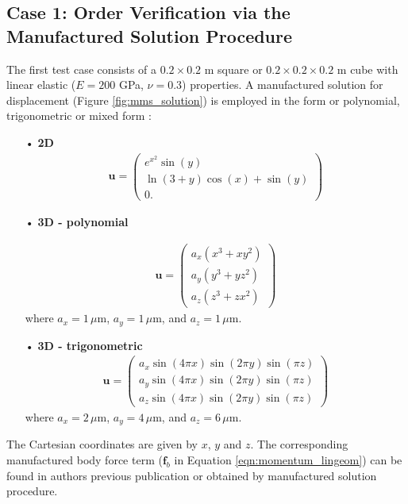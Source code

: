 \documentclass[sn-mathphys,Numbered]{sn-jnl}%
\newcommand{\bb}{\boldsymbol}
\begin{document}
\subsection{Case 1: Order Verification via the Manufactured Solution Procedure}
\label{case:mms}
%
The first test case consists of a  $0.2 \times 0.2$ m square or $0.2 \times 0.2 \times 0.2$ m cube with linear elastic ($E = 200$ GPa, $\nu = 0.3$) properties.
A manufactured solution for displacement (Figure \ref{fig:mms_solution}) is employed in the form or polynomial, trigonometric \citep{Mazzanti2024} or mixed form \citep{Castrillo2022}:
\begin{itemize}
\item[•] \textbf{2D} 
\begin{eqnarray}
	\bb{u} =
	\begin{pmatrix}
 e^{x^2}\sin(y)\\
\ln(3+y)\cos(x)+\sin(y)\\
 0.
	\end{pmatrix}
\end{eqnarray}
\item[•] \textbf{3D - polynomial}

\begin{eqnarray}
	\bb{u} =
	\begin{pmatrix}
	a_x(x^3 + xy^2) \\
	a_y(y^3 + yz^2) \\
	a_z(z^3 + zx^2)
	\end{pmatrix}
\end{eqnarray}
where $a_x = 1\,\mu$m, $a_y = 1\,\mu$m, and $a_z = 1\,\mu$m.
\item[•] \textbf{3D - trigonometric}
 \begin{eqnarray}
	\bb{u} =
	\begin{pmatrix}
	a_x \sin(4\pi x) \sin(2\pi y) \sin(\pi z) \\
	a_y \sin(4 \pi x) \sin(2 \pi y) \sin(\pi z) \\
	a_z \sin(4 \pi x) \sin(2 \pi y) \sin(\pi z) 
	\end{pmatrix}
\end{eqnarray}
where $a_x = 2\,\mu$m, $a_y = 4\,\mu$m, and $a_z = 6\,\mu$m.
\end{itemize}
The Cartesian coordinates are given by $x$, $y$ and $z$.
The corresponding manufactured body force term ($\bb{f}_b$ in Equation \ref{eqn:momentum_lingeom}) can be found in authors previous publication \citep{Cardiff2025} or obtained by manufactured solution procedure.
\end{document}
